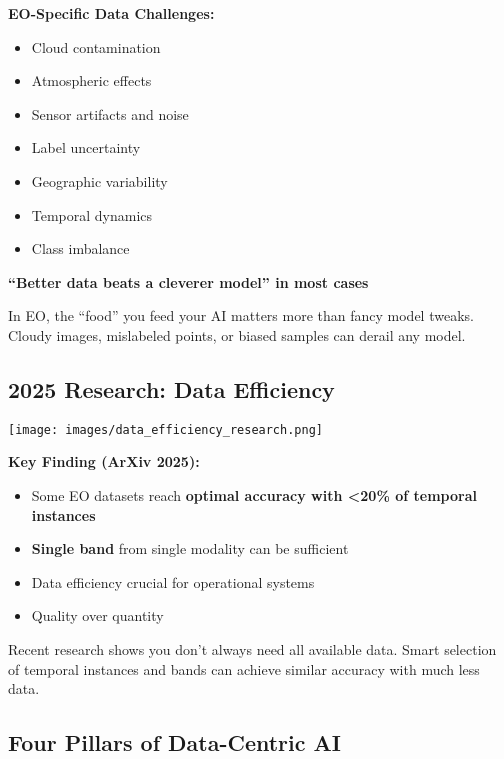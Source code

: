 \documentclass[
  letterpaper,
  DIV=11,
  numbers=noendperiod]{scrartcl}
\providecommand{\tightlist}{%
  \setlength{\itemsep}{0pt}\setlength{\parskip}{0pt}}
\begin{document}
\textbf{EO-Specific Data Challenges:}

\begin{itemize}
\tightlist
\item
  Cloud contamination
\item
  Atmospheric effects
\item
  Sensor artifacts and noise
\item
  Label uncertainty
\item
  Geographic variability
\item
  Temporal dynamics
\item
  Class imbalance
\end{itemize}

\textbf{``Better data beats a cleverer model'' in most cases}

In EO, the ``food'' you feed your AI matters more than fancy model
tweaks. Cloudy images, mislabeled points, or biased samples can derail
any model.

\subsection{2025 Research: Data
Efficiency}\label{research-data-efficiency}

\begin{center}
\texttt{[image: images/data\_efficiency\_research.png]}
\end{center}

\textbf{Key Finding (ArXiv 2025):}

\begin{itemize}
\tightlist
\item
  Some EO datasets reach \textbf{optimal accuracy with \textless20\% of
  temporal instances}
\item
  \textbf{Single band} from single modality can be sufficient
\item
  Data efficiency crucial for operational systems
\item
  Quality over quantity
\end{itemize}

Recent research shows you don't always need all available data. Smart
selection of temporal instances and bands can achieve similar accuracy
with much less data.

\subsection{Four Pillars of Data-Centric
AI}\label{four-pillars-of-data-centric-ai}
\end{document}
